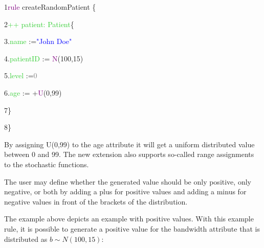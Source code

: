 {

1\hspace{0.5cm}\textcolor{Purple}{rule} createRandomPatient \{

2\hspace{1cm}\textcolor{LimeGreen}{++ patient: Patient}\{

3\hspace{1.5cm}.\textcolor{LimeGreen}{name} :=\textcolor{Blue}{"John Doe"}

4\hspace{1.5cm}.\textcolor{LimeGreen}{patientID} := \textcolor{Purple}{N}(100,15)

5\hspace{1.5cm}.\textcolor{LimeGreen}{level} :=\textcolor{Grey}{0}

6\hspace{1.5cm}.\textcolor{LimeGreen}{age} := +\textcolor{Purple}{U}(0,99)

7\hspace{1cm}\}

8\hspace{0.5cm}\} \newline

}

By assigning U(0,99) to the \textsf{age} attribute it will get a uniform distributed value between 0 and 99. The new extension also supports so-called range assignments to the stochastic functions. 

The user may define whether the generated value should be only positive, only negative, or both by adding a plus for positive values and adding a minus for negative values in front of the brackets of the distribution.\newline

The example above depicts an example with positive values. With this example rule, it is possible to generate a positive value for the bandwidth attribute that is distributed as $b \sim N(100,15)$:

\clearpage